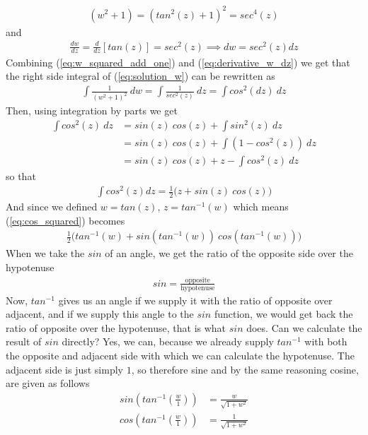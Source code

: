 \documentclass{article}
\begin{document}
\begin{align}
    \label{eq:w_squared_add_one}
    (w^2 + 1) = (tan^2(z) + 1)^2 = sec^4(z)
\end{align}
and
\begin{align}
    \label{eq:derivative_w_dz}
    \frac{dw}{dz} = \frac{d}{dz}[tan(z)] = sec^2(z) \implies dw = sec^2(z)dz
\end{align} 
Combining (\ref{eq:w_squared_add_one}) and (\ref{eq:derivative_w_dz}) we get that the right side integral of (\ref{eq:solution_w}) can be rewritten as
\begin{align}
    \int \frac{1}{(w^2 + 1)^2} ~ dw = \int \frac{1}{sec^2(z)}~dz = \int{cos^2(dz)}~dz
\end{align}
Then, using integration by parts we get 
\begin{align}
     \int cos^2(z) ~ dz &= sin(z)~cos(z) + \int sin^2(z) ~dz\\
    &= sin(z)~cos(z) + \int (1 - cos^2(z)) ~dz \\
    &= sin(z)~cos(z) + z - \int cos^2(z)~dz
\end{align}
so that
\begin{align}
    \label{eq:cos_squared}
    \int cos^2(z) dz = \frac{1}{2} \bigl(z + sin(z)~cos(z)\bigr)
\end{align}
And since we defined $w = tan(z)$, $z = tan^{-1}(w)$ which means (\ref{eq:cos_squared}) becomes
\begin{align}
    \frac{1}{2} \bigl(  tan^{-1}(w) + sin( tan^{-1}(w))~cos( tan^{-1}(w)) \bigr)
\end{align}
When we take the $sin$ of an angle, we get the ratio of the opposite side over the hypotenuse
\begin{align}
    sin = \frac{\text{opposite}}{\text{hypotenuse}}
\end{align}
Now, $tan^{-1}$ gives us an angle if we supply it with the ratio of opposite over adjacent, and if we supply this angle to the $sin$ function, we would get back the ratio of opposite over the hypotenuse, that is what $sin$ does. Can we calculate the result of $sin$ directly? Yes, we can, because we already supply $tan^{-1}$ with both the opposite and adjacent side with which we can calculate the hypotenuse. The adjacent side is just simply $1$, so therefore sine and by the same reasoning cosine, are given as follows
\begin{align}
    sin(tan^{-1}(\frac{w}{1})) &= \frac{w}{\sqrt{1 + w^2}} \\
    cos(tan^{-1}(\frac{w}{1})) &= \frac{1}{\sqrt{1 + w^2}}
\end{align}
\end{document}
